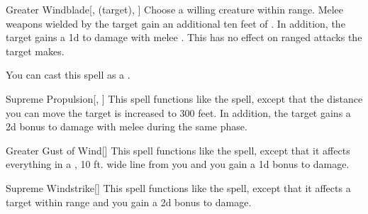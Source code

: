\lowercase{\hypertarget{spell:Greater Windblade}{}}\label{spell:Greater Windblade}
\begin{attuneability}[\nth{4}]{\hypertarget{spell:Greater Windblade}{Greater Windblade}}[,  (target), ]
Choose a willing creature within \rngclose range.
Melee weapons wielded by the target gain an additional ten feet of .
In addition, the target gains a \plus1d  to damage with melee .
This has no effect on ranged attacks the target makes.

You can cast this spell as a .
\end{attuneability}
\vspace{0.25em}



\lowercase{\hypertarget{spell:Supreme Propulsion}{}}\label{spell:Supreme Propulsion}
\begin{apability}[\nth{4}]{\hypertarget{spell:Supreme Propulsion}{Supreme Propulsion}}[, ]
This spell functions like the  spell, except that the distance you can move the target is increased to 300 feet.
In addition, the target gains a \plus2d bonus to damage with melee  during the same phase.
\end{apability}
\vspace{0.25em}



\lowercase{\hypertarget{spell:Greater Gust of Wind}{}}\label{spell:Greater Gust of Wind}
\begin{apability}[\nth{5}]{\hypertarget{spell:Greater Gust of Wind}{Greater Gust of Wind}}[]
This spell functions like the  spell, except that it affects everything in a \areahuge, 10 ft. wide line from you and you gain a \plus1d bonus to damage.
\end{apability}
\vspace{0.25em}



\lowercase{\hypertarget{spell:Supreme Windstrike}{}}\label{spell:Supreme Windstrike}
\begin{apability}[\nth{5}]{\hypertarget{spell:Supreme Windstrike}{Supreme Windstrike}}[]
This spell functions like the  spell, except that it affects a target within \rngext range and you gain a \plus2d bonus to damage.
\end{apability}
\vspace{0.25em}



